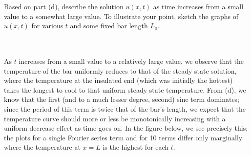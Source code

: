 Based on part (d), describe the solution $u(x, t)$ as time increases from a small value to a somewhat large value.
To illustrate your point, sketch the graphs of $u(x, t)$ for various $t$ and some fixed bar length $L_0$.

\begin{solution}\ \\\\
    As $t$ increases from a small value to a relatively large value, we observe that the temperature of the bar 
    uniformly reduces to that of the steady state solution, where the temperature at the insulated end 
    (which was initially the hottest) takes the longest to cool to that uniform steady state temperature. From (d), we
    know that the first (and to a much lesser degree, second) sine term dominates; since the period of this term is 
    twice that of the bar's length, we expect that the temperature curve should more or less be monotonically increasing
    with a uniform decrease effect as time goes on. In the figure below, we see precisely this; the plots for a single
    Fourier series term and for 10 terms differ only marginally where the temperature at $x = L$ is the highest for 
    each $t$.    


\end{solution}
